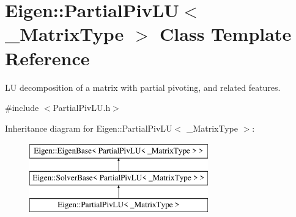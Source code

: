\hypertarget{class_eigen_1_1_partial_piv_l_u}{}\section{Eigen\+::Partial\+Piv\+LU$<$ \+\_\+\+Matrix\+Type $>$ Class Template Reference}
\label{class_eigen_1_1_partial_piv_l_u}


LU decomposition of a matrix with partial pivoting, and related features.  




{\ttfamily \#include $<$Partial\+Piv\+L\+U.\+h$>$}

Inheritance diagram for Eigen\+::Partial\+Piv\+LU$<$ \+\_\+\+Matrix\+Type $>$\+:\begin{figure}[H]
\begin{center}
\leavevmode
\includegraphics[height=3.000000cm]{class_eigen_1_1_partial_piv_l_u}
\end{center}
\end{figure}
